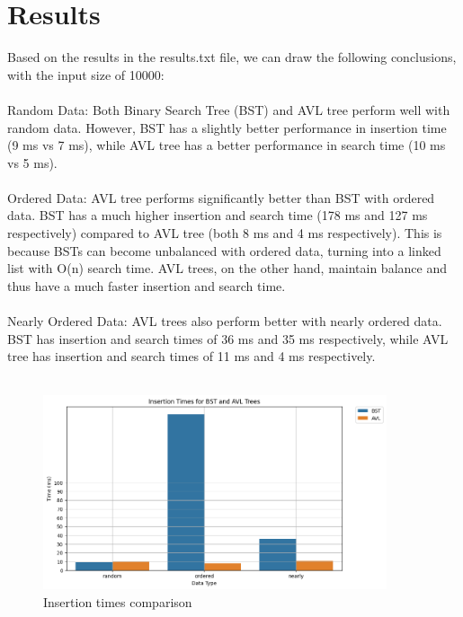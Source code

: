 \documentclass{article}
\begin{document}
\section{Results}
Based on the results in the results.txt file, we can draw the following conclusions, with the input size of 10000:\\\\
Random Data: Both Binary Search Tree (BST) and AVL tree perform well with random data. However, BST has a slightly better performance in insertion time (9 ms vs 7 ms), while AVL tree has a better performance in search time (10 ms vs 5 ms).\\\\
Ordered Data: AVL tree performs significantly better than BST with ordered data. BST has a much higher insertion and search time (178 ms and 127 ms respectively) compared to AVL tree (both 8 ms and 4 ms respectively). This is because BSTs can become unbalanced with ordered data, turning into a linked list with O(n) search time. AVL trees, on the other hand, maintain balance and thus have a much faster insertion and search time.\\\\
Nearly Ordered Data: AVL trees also perform better with nearly ordered data. BST has insertion and search times of 36 ms and 35 ms respectively, while AVL tree has insertion and search times of 11 ms and 4 ms respectively.\\\\
\newpage
\begin{figure}[h]
\centering
\includegraphics[width=0.9\textwidth]{../data/graphs/insertion_times.png}
\caption{Insertion times comparison}
\end{figure}
\end{document}
